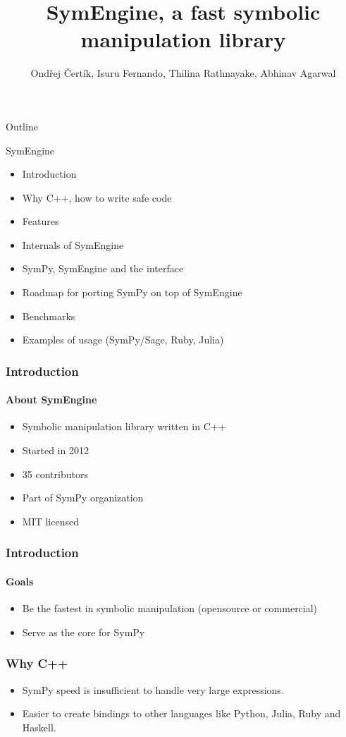 \documentclass{beamer}
\title[SymEngine \hspace{14em}\insertframenumber/
\inserttotalframenumber]{SymEngine, a fast symbolic manipulation library}
\author[O. Čertík, I. Fernando, ...]{Ondřej Čertík, Isuru Fernando, Thilina Rathnayake, Abhinav Agarwal}
\begin{document}
\begin{frame}
\maketitle
\end{frame}


\begin{frame}{Outline}
\begin{block}{SymEngine}
\begin{itemize}
\item Introduction
\item Why C++, how to write safe code
\item Features
\item Internals of SymEngine
\item SymPy, SymEngine and the interface
\item Roadmap for porting SymPy on top of SymEngine
\item Benchmarks
\item Examples of usage (SymPy/Sage, Ruby, Julia)
\end{itemize}
\end{block}
\end{frame}


\begin{frame}
\frametitle{Introduction}
\framesubtitle{About SymEngine}
\begin{itemize}
\item Symbolic manipulation library written in C++
\item Started in 2012
\item 35 contributors
\item Part of SymPy organization
\item MIT licensed
\end{itemize}
\end{frame}


\begin{frame}
\frametitle{Introduction}
\framesubtitle{Goals}
\begin{itemize}
\item Be the fastest in symbolic manipulation (opensource or commercial)
\item Serve as the core for SymPy
\end{itemize}
\end{frame}


\begin{frame}
\frametitle{Why C++}
\begin{itemize}
\item SymPy speed is insufficient to handle very large expressions.
\item Easier to create bindings to other languages like Python, Julia, Ruby and Haskell.
\end{itemize}
\end{frame}
\end{document}
